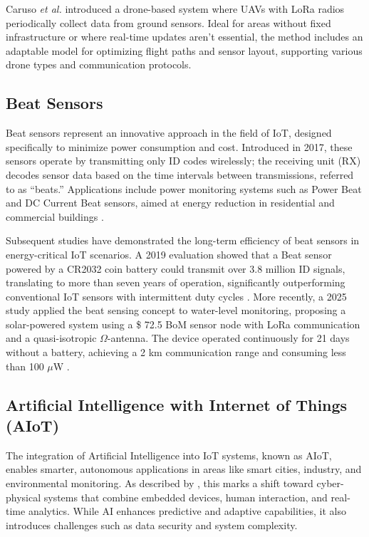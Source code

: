 \documentclass[conference]{IEEEtran}
\begin{document}
Caruso \textit{et al.} \cite{caruso_2021_drone} introduced a drone-based system where UAVs with LoRa radios periodically collect data from ground sensors. Ideal for areas without fixed infrastructure or where real-time updates aren't essential, the method includes an adaptable model for optimizing flight paths and sensor layout, supporting various drone types and communication protocols.

\subsection{Beat Sensors}

Beat sensors represent an innovative approach in the field of IoT, designed specifically to minimize power consumption and cost. Introduced in 2017, these sensors operate by transmitting only ID codes wirelessly; the receiving unit (RX) decodes sensor data based on the time intervals between transmissions, referred to as “beats.” Applications include power monitoring systems such as Power Beat and DC Current Beat sensors, aimed at energy reduction in residential and commercial buildings \cite{ishibashi_2017_beat}.

Subsequent studies have demonstrated the long-term efficiency of beat sensors in energy-critical IoT scenarios. A 2019 evaluation showed that a Beat sensor powered by a CR2032 coin battery could transmit over 3.8 million ID signals, translating to more than seven years of operation, significantly outperforming conventional IoT sensors with intermittent duty cycles \cite{ishibashi_2019_long}. More recently, a 2025 study applied the beat sensing concept to water-level monitoring, proposing a solar-powered system using a \$ 72.5 BoM sensor node with LoRa communication and a quasi-isotropic $\Omega$-antenna. The device operated continuously for 21 days without a battery, achieving a 2 km communication range and consuming less than 100 $\mu$W \cite{dao_2025_lowcost}.

\subsection{Artificial Intelligence with Internet of Things (AIoT)}

The integration of Artificial Intelligence into IoT systems, known as AIoT, enables smarter, autonomous applications in areas like smart cities, industry, and environmental monitoring. As described by \cite{ghosh_2018_artificial}, this marks a shift toward cyber-physical systems that combine embedded devices, human interaction, and real-time analytics. While AI enhances predictive and adaptive capabilities, it also introduces challenges such as data security and system complexity.
\end{document}
